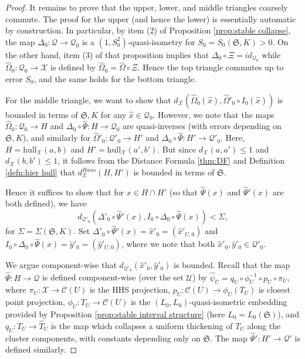 \documentclass{amsart}
\theoremstyle{definition}
\theoremstyle{remark}
\theoremstyle{definition}
\newcommand{\calC}{\mathcal{C}}
\newcommand{\calQ}{\mathcal{Q}}
\newcommand{\calU}{\mathcal{U}}
\newcommand{\calX}{\mathcal{X}}
\newcommand{\hT}{\widehat{T}}
\newcommand{\hx}{\hat{x}}
\newcommand{\hy}{\hat{y}}
\newcommand{\hO}{\widehat{\Omega}}
\newcommand{\hpsi}{\hat{\psi}}
\newcommand{\hPsi}{\widehat{\Psi}}
\newcommand{\hull}{\mathrm{hull}}
\begin{document}
\begin{proof}

It remains to prove that the upper, lower, and middle triangles coarsely commute.  The proof for the upper (and hence the lower) is essentially automatic by construction.  In particular, by item (2) of Proposition \ref{prop:stable collapse}, the map $\Delta_0:\calQ \to \calQ_0$ is a $(1,S^2_0)$-quasi-isometry for $S_0 = S_0(\mathfrak S, K)>0$.  On the other hand, item (3) of that proposition implies that $\Delta_0 \circ \Xi = id_{\calQ_0}$ while $\hO_0:\calQ_0 \to \calX$ is defined by $\hO_0 = \hO \circ \Xi$.  Hence the top triangle commutes up to error $S_0$, and the same holds for the bottom triangle.

For the middle triangle, we want to show that $d_{\calX}(\hO_0(\hx), \hO'_0 \circ I_0(\hx))$ is bounded in terms of $\mathfrak S, K$ for any $\hx \in \calQ_0$.  However, we note that the maps $\hO_0:\calQ_0 \to H$ and $\Delta_0 \circ \hPsi:H \to \calQ_0$ are quasi-inverses (with errors depending on $\mathfrak S, K$), and similarly for $\hO'_0:\calQ'_0 \to H'$ and $\Delta_0 \circ \hPsi:H' \to \calQ'_0$.  Here, $H = \hull_{\calX}(a,b)$ and $H' = \hull_{\calX}(a',b')$.  But since $d_{\calX}(a,a')\leq 1$ and $d_{\calX}(b,b')\leq 1$, it follows from the Distance Formula \ref{thm:DF} and Definition \ref{defn:hier hull} that $d^{Haus}_{\calX}(H,H')$ is bounded in terms of $\mathfrak S$.

Hence it suffices to show that for $x \in H \cap H'$ (so that $\hPsi(x)$ and $\hPsi'(x)$ are both defined), we have
$$d_{\calQ'_0}(\Delta'_0 \circ \hPsi'(x), I_0 \circ \Delta_0 \circ \hPsi(x))< \Sigma,$$
for $\Sigma = \Sigma(\mathfrak S, K)$.  Set $\Delta'_0 \circ \hPsi'(x) = \hx'_0 = (\hx'_{U,0})$ and $I_0 \circ \Delta_0 \circ \hPsi(x) = \hy'_0= (\hy'_{U,0})$, where we note that both $\hx'_0,\hy'_0 \in \calQ'_0$.  

We argue component-wise that $d_{\calQ'_0}(\hx'_0,\hy'_0)$ is bounded.  Recall that the map $\hPsi:H \to \calQ$ is defined component-wise (over the set $\calU$) by $\hpsi_U = q_U \circ \phi_U^{-1} \circ p_U \circ \pi_U$, where $\pi_U:\calX \to \calC(U)$ is the HHS projection, $p_U:\calC(U) \to \phi_U(T_U)$ is closest point projection, $\phi_U:T_U \to \calC(U)$ is the $(L_0,L_0)$-quasi-isometric embedding provided by Proposition \ref{prop:stable interval structure} (here $L_0=L_0(\mathfrak S)$), and $q_U:T_U \to \hT_U$ is the map which collapses a uniform thickening of $T_U$ along the cluster components, with constants depending only on $\mathfrak S$.  The map $\hPsi':H' \to \calQ'$ is defined similarly.


\end{proof}
\end{document}
